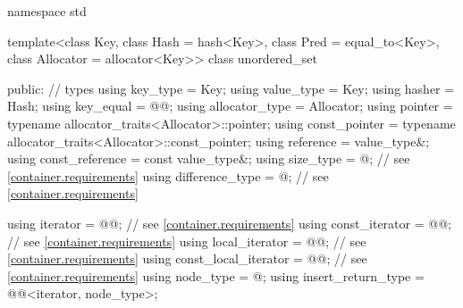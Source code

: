 %
\begin{codeblock}
namespace std {
  template<class Key,
           class Hash = hash<Key>,
           class Pred = equal_to<Key>,
           class Allocator = allocator<Key>>
  class unordered_set {
  public:
    // types
    using key_type             = Key;
    using value_type           = Key;
    using hasher               = Hash;
    using key_equal            = @@;
    using allocator_type       = Allocator;
    using pointer              = typename allocator_traits<Allocator>::pointer;
    using const_pointer        = typename allocator_traits<Allocator>::const_pointer;
    using reference            = value_type&;
    using const_reference      = const value_type&;
    using size_type            = @\impdef@; // see \ref{container.requirements}
    using difference_type      = @\impdef@; // see \ref{container.requirements}

    using iterator             = @@; // see \ref{container.requirements}
    using const_iterator       = @@; // see \ref{container.requirements}
    using local_iterator       = @@; // see \ref{container.requirements}
    using const_local_iterator = @@; // see \ref{container.requirements}
    using node_type            = @\unspec@;
    using insert_return_type   = @@<iterator, node_type>;

}}
\end{codeblock}
